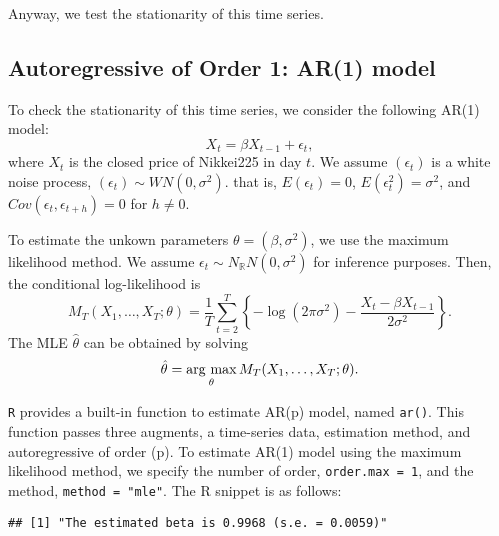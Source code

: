 \documentclass[
  12pt,
]{article}
\newenvironment{Shaded}{\begin{snugshade}}{\end{snugshade}}
\newcommand{\DataTypeTok}[1]{\textcolor[rgb]{0.13,0.29,0.53}{#1}}
\newcommand{\DecValTok}[1]{\textcolor[rgb]{0.00,0.00,0.81}{#1}}
\newcommand{\KeywordTok}[1]{\textcolor[rgb]{0.13,0.29,0.53}{\textbf{#1}}}
\newcommand{\NormalTok}[1]{#1}
\newcommand{\OperatorTok}[1]{\textcolor[rgb]{0.81,0.36,0.00}{\textbf{#1}}}
\newcommand{\StringTok}[1]{\textcolor[rgb]{0.31,0.60,0.02}{#1}}
\begin{document}
Anyway, we test the stationarity of this time series.

\hypertarget{autoregressive-of-order-1-ar1-model}{%
\subsection{Autoregressive of Order 1: AR(1) model}\label{autoregressive-of-order-1-ar1-model}}

To check the stationarity of this time series, we consider the following AR(1) model:
\[ X_t = \beta X_{t-1} + \epsilon_t, \]
where \(X_t\) is the closed price of Nikkei225 in day \(t\).
We assume \((\epsilon_t)\) is a white noise process, \((\epsilon_t) \sim WN(0, \sigma^2)\).
that is, \(E(\epsilon_t) = 0\), \(E(\epsilon_t^2) = \sigma^2\), and \(Cov(\epsilon_t, \epsilon_{t+h}) = 0\) for \(h \not= 0\).

To estimate the unkown parameters \(\theta = (\beta, \sigma^2)\),
we use the maximum likelihood method.
We assume \(\epsilon_t \sim N_{\mathbb{R}}N(0, \sigma^2)\) for inference purposes.
Then, the conditional log-likelihood is
\[
  M_T(X_1, \ldots, X_T; \theta) 
  = \frac{1}{T} \sum_{t=2}^T \left\{ -\log(2\pi\sigma^2) - \frac{X_t - \beta X_{t-1}}{2\sigma^2} \right\}.
\]
The MLE \(\hat{\theta}\) can be obtained by solving
\[ \hat{\theta} = \mathop{\rm arg~max}\limits_{\theta} M_T(X_1, \ldots, X_T; \theta). \]

\texttt{R} provides a built-in function to estimate AR(p) model, named \texttt{ar()}.
This function passes three augments,
a time-series data, estimation method, and autoregressive of order (p).
To estimate AR(1) model using the maximum likelihood method,
we specify the number of order, \texttt{order.max\ =\ 1}, and the method, \texttt{method\ =\ "mle"}.
The R snippet is as follows:

\begin{Shaded}
\end{Shaded}

\begin{verbatim}
## [1] "The estimated beta is 0.9968 (s.e. = 0.0059)"
\end{verbatim}
\end{document}
